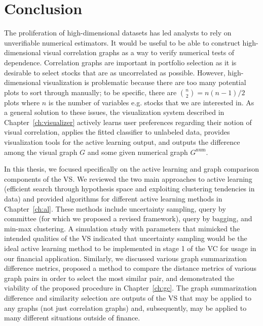 \section{Conclusion}
\label{sec:conclusion}

The proliferation of high-dimensional datasets has led analysts to rely on 
unverifiable numerical estimators. It would be useful to be able to construct 
high-dimensional visual correlation graphs as a way to verify numerical 
tests of dependence. Correlation graphs are important in portfolio selection as 
it is desirable to select stocks that are as uncorrelated as 
possible. However, high-dimensional visualization is problematic because there 
are too many potential plots to sort through manually; to be 
specific, there are ${n\choose 2} = n(n-1)/2$  plots where $n$ is the number of 
variables e.g. stocks that we are interested in. As a general solution to these 
issues, the visualization system described in Chapter~\ref{ch:visualizer} 
actively learns user preferences regarding 
their notion of visual correlation, applies 
the fitted classifier to unlabeled data, provides visualization tools for the 
active learning output, and outputs the difference among the visual graph $G$ 
and some given numerical graph $G^{\text{num}}$.

In this thesis, we focused specifically on the active learning and graph 
comparison components of the VS. We reviewed the two main approaches to active 
learning (efficient search through hypothesis space and 
exploiting clustering tendencies in data) and provided algorithms for 
different active learning methods in Chapter~\ref{ch:al}. These methods include 
uncertainty sampling, query by committee (for which we proposed a revised 
framework), query by bagging, and min-max clustering. A simulation study 
with parameters that mimicked the intended qualities of the VS indicated that 
uncertainty sampling would be the ideal active learning method to be 
implemented in stage 1 of the VC for usage in our financial application. 
Similarly, we discussed 
various graph summarization difference metrics, proposed a method to compare 
the distance metrics of various graph pairs in order to select the most 
similar pair, and demonstrated the viability of the proposed procedure in 
Chapter~\ref{ch:gc}. The graph summarization difference and similarity 
selection are outputs of the VS that may be applied to any graphs (not just 
correlation graphs) and, subsequently, may be applied to many different 
situations outside of finance.

